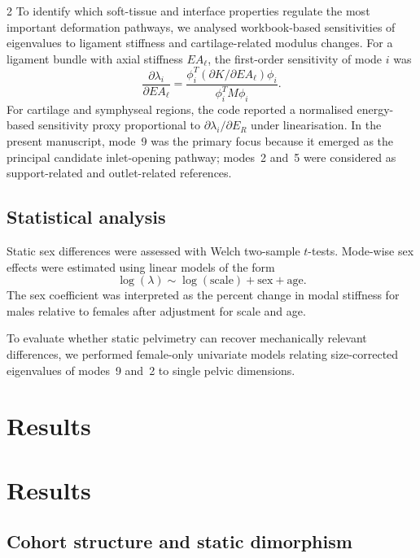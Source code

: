 \documentclass[openacc]{rsproca_new}
\begin{document}
\begin{multicols}{2}
To identify which soft-tissue and interface properties regulate the most important deformation pathways, we analysed workbook-based sensitivities of eigenvalues to ligament stiffness and cartilage-related modulus changes. For a ligament bundle with axial stiffness $EA_{\ell}$, the first-order sensitivity of mode $i$ was
\begin{equation}
\frac{\partial \lambda_{i}}{\partial EA_{\ell}}
=
\frac{\phi_{i}^{T}\left(\partial K/\partial EA_{\ell}\right)\phi_{i}}
{\phi_{i}^{T}M\phi_{i}}.
\end{equation}
For cartilage and symphyseal regions, the code reported a normalised energy-based sensitivity proxy proportional to $\partial \lambda_{i}/\partial E_{R}$ under linearisation. In the present manuscript, mode~9 was the primary focus because it emerged as the principal candidate inlet-opening pathway; modes~2 and~5 were considered as support-related and outlet-related references.

\subsection{Statistical analysis}

Static sex differences were assessed with Welch two-sample $t$-tests. Mode-wise sex effects were estimated using linear models of the form
\begin{equation}
\log(\lambda) \sim \log(\mathrm{scale}) + \mathrm{sex} + \mathrm{age}.
\end{equation}
The sex coefficient was interpreted as the percent change in modal stiffness for males relative to females after adjustment for scale and age.

To evaluate whether static pelvimetry can recover mechanically relevant differences, we performed female-only univariate models relating size-corrected eigenvalues of modes~9 and~2 to single pelvic dimensions.

\section{Results}
\section{Results}


\subsection{Cohort structure and static dimorphism}


\end{multicols}
\end{document}
